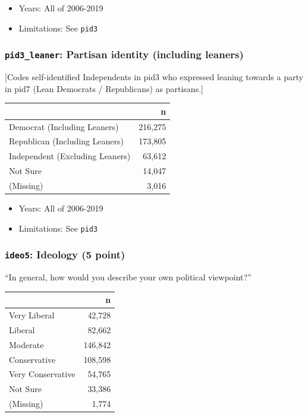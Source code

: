 \documentclass[10pt,article,oneside]{memoir}
\theoremstyle{definition}
\begin{document}
\begin{itemize}
\tightlist
\item
  Years: All of 2006-2019
\item
  Limitations: See \texttt{pid3}
\end{itemize}

\hypertarget{pid3_leaner-partisan-identity-including-leaners}{%
\subsubsection{\texorpdfstring{\texttt{pid3\_leaner}: Partisan identity
(including
leaners)}{pid3\_leaner: Partisan identity (including leaners)}}\label{pid3_leaner-partisan-identity-including-leaners}}

{[}Codes self-identified Independents in pid3 who expressed leaning
towards a party in pid7 (Lean Democrats / Republicans) as partisans.{]}

\begin{table}[H]
\centering
\begin{tabular}{lr}
\toprule
 & n\\
\midrule
Democrat (Including Leaners) & 216,275\\
Republican (Including Leaners) & 173,805\\
Independent (Excluding Leaners) & 63,612\\
Not Sure & 14,047\\
(Missing) & 3,016\\
\bottomrule
\end{tabular}
\end{table}

\begin{itemize}
\tightlist
\item
  Years: All of 2006-2019
\item
  Limitations: See \texttt{pid3}
\end{itemize}

\hypertarget{ideo5-ideology-5-point}{%
\subsubsection{\texorpdfstring{\texttt{ideo5}: Ideology (5
point)}{ideo5: Ideology (5 point)}}\label{ideo5-ideology-5-point}}

``In general, how would you describe your own political viewpoint?''

\begin{table}[H]
\centering
\begin{tabular}{lr}
\toprule
 & n\\
\midrule
Very Liberal & 42,728\\
Liberal & 82,662\\
Moderate & 146,842\\
Conservative & 108,598\\
Very Conservative & 54,765\\
Not Sure & 33,386\\
(Missing) & 1,774\\
\bottomrule
\end{tabular}
\end{table}
\end{document}
